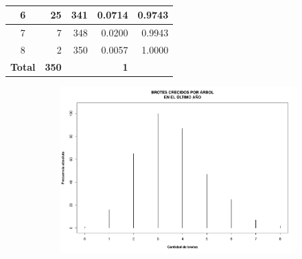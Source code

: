 \documentclass[11pt]{article}
\begin{document}
\begin{table}[h!]
\begin{center}
\begin{tabular}{| c | r | r | r | r |}
      6                                                                     & 25           & 341 & 0.0714     & 0.9743 \\ \hline
      7                                                                     & 7            & 348 & 0.0200     & 0.9943 \\ \hline
      8                                                                     & 2            & 350 & 0.0057     & 1.0000 \\ \hline
      \textbf{Total}                                                        & \textbf{350} &     & \textbf{1} &        \\ \hline
    \end{tabular}
    \caption{}
    \label{tab:tablaBrotes}
  \end{center}
\end{table}

\begin{figure}[h!]
  \begin{center}
    \begin{subfigure}[b]{0.9\linewidth}
      \includegraphics[width=\linewidth]{bastonesBrotes.pdf}
      \caption{}
      \label{fig:bastonesBrotes}
    \end{subfigure}
  \end{center}
\end{figure}
\end{document}
